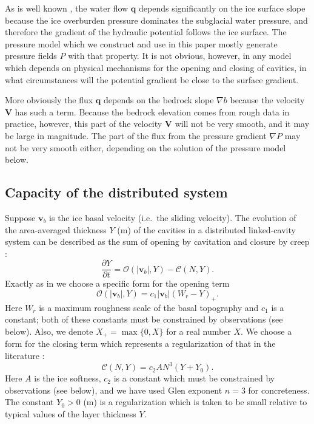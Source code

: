 \documentclass[11pt,final]{amsart}%
\newcommand\bv{\mathbf{v}}
\newcommand\bV{\mathbf{V}}
\newcommand\bq{\mathbf{q}}
\newcommand{\grad}{\nabla}
\begin{document}
As is well known \citep{Clarke05}, the water flow $\bq$ depends significantly on the ice surface slope because the ice overburden pressure dominates the subglacial water pressure, and therefore the gradient of the hydraulic potential follows the ice surface.  The pressure model which we construct and use in this paper mostly generate pressure fields $P$ with that property.  It is not obvious, however, in any model which depends on physical mechanisms for the opening and closing of cavities, in what circumstances will the potential gradient be close to the surface gradient.

More obviously the flux $\bq$ depends on the bedrock slope $\grad b$ because the velocity $\bV$ has such a term.  Because the bedrock elevation comes from rough data in practice, however, this part of the velocity $\bV$ will not be very smooth, and it may be large in magnitude.  The part of the flux from the pressure gradient $\grad P$ may not be very smooth either, depending on the solution of the pressure model below.


\subsection*{Capacity of the distributed system}  Suppose $\bv_b$ is the ice basal velocity (i.e.~the sliding velocity).  The evolution of the area-averaged thickness $Y$ (m) of the cavities in a distributed linked-cavity system \citep{Schoofetal2012} can be described as the sum of opening by cavitation and closure by creep \citep{Hewitt2011}:
\begin{equation}
\frac{\partial Y}{\partial t} = \mathcal{O}(|\bv_b|,Y) - \mathcal{C}(N,Y). \label{eq:hewittcapacity}
\end{equation}
Exactly as in \cite{Schoofetal2012} we choose a specific form for the opening term
\begin{equation}
 \mathcal{O}(|\bv_b|,Y) = c_1 |\bv_b| (W_r - Y)_+. \label{eq:openingform}
\end{equation}
Here $W_r$ is a maximum roughness scale of the basal topography and $c_1$ is a constant; both of these constants must be constrained by observations (see below).  Also, we denote $X_+= \max\{0,X\}$ for a real number $X$.  We choose a form for the closing term which represents a regularization of that in the literature \citep{Hewitt2011,Schoofmeltsupply,Schoofetal2012}:
\begin{equation}
\mathcal{C}(N,Y) = c_2 A N^3 (Y+Y_0). \label{eq:closingform}
\end{equation}
Here $A$ is the ice softness, $c_2$ is a constant which must be constrained by observations (see below), and we have used Glen exponent $n=3$ for concreteness.  The constant $Y_0>0$ (m) is a regularization which is taken to be small relative to typical values of the layer thickness $Y$.
\end{document}
